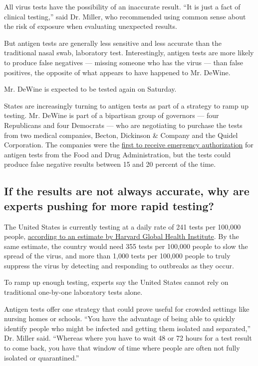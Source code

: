 All virus tests have the possibility of an inaccurate result. ``It is
just a fact of clinical testing,'' said Dr. Miller, who recommended
using common sense about the risk of exposure when evaluating unexpected
results.

But antigen tests are generally less sensitive and less accurate than
the traditional nasal swab, laboratory test. Interestingly, antigen
tests are more likely to produce false negatives --- missing someone who
has the virus --- than false positives, the opposite of what appears to
have happened to Mr. DeWine.

Mr. DeWine is expected to be tested again on Saturday.

States are increasingly turning to antigen tests as part of a strategy
to ramp up testing. Mr. DeWine is part of a bipartisan group of
governors --- four Republicans and four Democrats --- who are
negotiating to purchase the tests from two medical companies, Becton,
Dickinson \& Company and the Quidel Corporation. The companies were the
\href{https://www.nytimes3xbfgragh.onion/2020/07/06/health/fast-coronavirus-tests.html}{first
to receive emergency authorization} for antigen tests from the Food and
Drug Administration, but the tests could produce false negative results
between 15 and 20 percent of the time.

\hypertarget{if-the-results-are-not-always-accurate-why-are-experts-pushing-for-more-rapid-testing}{%
\subsection{If the results are not always accurate, why are experts
pushing for more rapid
testing?}\label{if-the-results-are-not-always-accurate-why-are-experts-pushing-for-more-rapid-testing}}

The United States is currently testing at a daily rate of 241 tests per
100,000 people,
\href{https://globalepidemics.org/july-6-2020-state-testing-targets/}{according
to an estimate by Harvard Global Health Institute}. By the same
estimate, the country would need 355 tests per 100,000 people to slow
the spread of the virus, and more than 1,000 tests per 100,000 people to
truly suppress the virus by detecting and responding to outbreaks as
they occur.

To ramp up enough testing, experts say the United States cannot rely on
traditional one-by-one laboratory tests alone.

Antigen tests offer one strategy that could prove useful for crowded
settings like nursing homes or schools. ``You have the advantage of
being able to quickly identify people who might be infected and getting
them isolated and separated,'' Dr. Miller said. ``Whereas where you have
to wait 48 or 72 hours for a test result to come back, you have that
window of time where people are often not fully isolated or
quarantined.''

